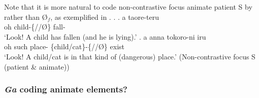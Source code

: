 Note that
it is more natural to code non-contrastive focus animate patient S by  rather than {\O$_{f}$}, as exemplified in \Next.
%
\ex. \label{ExAnimateS}
	\ag. a  taore-teru \\
		oh child-\{//{\O}\} fall- \\
		`Look! A child has fallen (and he is lying).'
	\bg. a anna tokoro-ni  iru \\
		oh such place- \{child/cat\}-\{//{\O}\} exist \\
		`Look! A child/cat is in that kind of (dangerous) place.' \hfill{(Non-contrastive focus S (patient \& animate))}


\subsubsection{\textit{Ga} coding animate elements?}\label{Par:CasePar:Ga:GaAnim}

